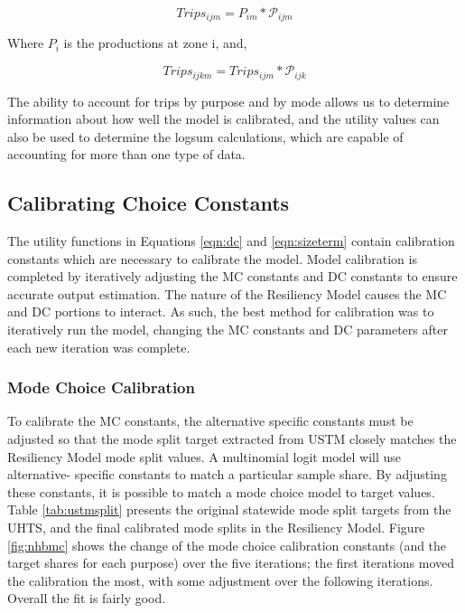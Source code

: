 \begin{equation}
	Trips_{ijm} = P_{im} * \mathcal{P}_{ijm}
	\label{eqn:ij}
\end{equation}

\noindent Where $P_i$ is the productions at zone i, and,

\begin{equation}
	Trips_{ijkm} = Trips_{ijm} * \mathcal{P}_{ijk}
	\label{eqn:ijk}
\end{equation}

\noindent The ability to account for trips by purpose and by mode allows us to
determine information about how well the model is calibrated, and the utility
values can also be used to determine the logsum calculations, which are capable
of accounting for more than one type of data.


\subsection{Calibrating Choice Constants}

The utility functions in Equations \ref{eqn:dc} and \ref{eqn:sizeterm} contain
calibration constants which are necessary to calibrate the model. Model
calibration is completed by iteratively adjusting the MC
constants and DC constants to ensure accurate output estimation. The nature
of the Resiliency Model causes the MC and DC portions to interact. As such,
the best method for calibration was to iteratively run the model, changing
the MC constants and DC parameters after each new iteration was complete.

\subsubsection{Mode Choice Calibration}

To calibrate the MC constants, the alternative specific constants must be
adjusted so that the mode split target extracted from USTM closely matches the
Resiliency Model mode split values. A multinomial logit model will use alternative-
specific constants to match a particular sample share. By adjusting these
constants, it is possible to match a mode choice model to target values.
Table \ref{tab:ustmsplit} presents the original statewide mode split targets from the UHTS,
and the final calibrated mode splits in the Resiliency Model.
Figure \ref{fig:nhbmc} shows the change of the mode choice calibration constants
(and the target shares for each purpose) over the five iterations;
the first iterations moved the calibration the most, with some adjustment
over the following iterations. Overall the fit is fairly good.

